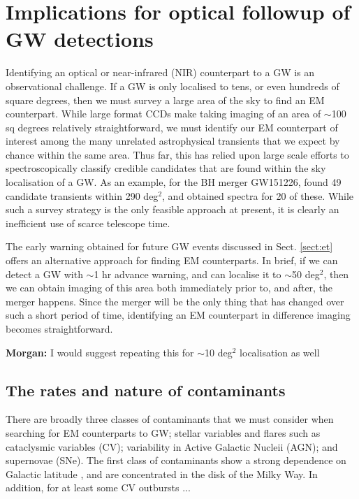\documentclass{aa}
\begin{document}
\section{Implications for optical followup of GW detections} \label{sect:EM}
Identifying an optical or near-infrared (NIR) counterpart to a GW is an observational challenge. If a GW is only localised to tens, or even hundreds of square degrees, then we must survey a large area of the sky to find an EM counterpart. While large format CCDs make taking imaging of an area of $\sim$100 sq degrees relatively straightforward, we must identify our EM counterpart of interest among the many unrelated astrophysical transients that we expect by chance within the same area. Thus far, this has relied upon large scale efforts to spectroscopically classify credible candidates that are found within the sky localisation of a GW. As an example, for the BH merger GW151226, \cite{Smar16} found 49 candidate transients within 290 deg$^2$, and obtained spectra for 20 of these. While such a survey strategy is the only feasible approach at present, it is clearly an inefficient use of scarce telescope time.

The early warning obtained for future GW events discussed in Sect. \ref{sect:et} offers an alternative approach for finding EM counterparts. In brief, if we can detect a GW with $\sim$1 hr advance warning, and can localise it to $\sim$50 deg$^2$, then we can obtain imaging of this area both immediately prior to, and after, the merger happens. Since the merger will be the only thing that has changed over such a short period of time, identifying an EM counterpart in difference imaging becomes straightforward.

{\bf Morgan:} I would suggest repeating this for $\sim$10 deg$^2$ localisation as well

\subsection{The rates and nature of contaminants}

There are broadly three classes of contaminants that we must consider when searching for EM counterparts to GW; stellar variables and flares such as cataclysmic variables (CV); variability in Active Galactic Nucleii (AGN); and supernovae (SNe). The first class of contaminants show a strong dependence on Galactic latitude \citep{Drak14}, and are concentrated in the disk of the Milky Way. In addition, for at least some CV outbursts ...
\end{document}
